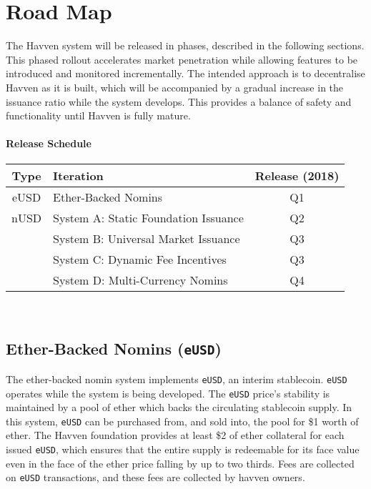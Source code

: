 \section{Road Map}

The Havven system will be released in phases, described in the following
sections. This phased rollout accelerates market penetration while
allowing features to be introduced and monitored incrementally. The intended approach  
is to decentralise Havven as it is built, which will be accompanied by a gradual
increase in the issuance ratio while the system develops.
This provides a balance of safety and functionality until Havven is fully
mature.

\paragraph{Release Schedule}
\renewcommand{\arraystretch}{1.5}
\setlength{\tabcolsep}{13pt}
\begin{centering}
    \begin{tabular}{|c|l|c|}
        \hline
        \textbf{Type} & \textbf{Iteration} & \textbf{Release (2018)} \\
        \hline
        \hline
        eUSD & Ether-Backed Nomins & Q1 \\
        \hline
        \hline
        nUSD & System A: Static Foundation Issuance & Q2 \\ \cline{2-3}
        & System B: Universal Market Issuance & Q3 \\ \cline{2-3}
        & System C: Dynamic Fee Incentives & Q3 \\ \cline{2-3}
        & System D: Multi-Currency Nomins& Q4 \\
        \hline
    \end{tabular} \\
\end{centering}
\vspace{0.5cm}

\subsection{Ether-Backed Nomins (\texttt{eUSD})}

\noindent The ether-backed nomin system implements \texttt{eUSD}, an interim stablecoin.
\texttt{eUSD} operates while the system is being developed.
The \texttt{eUSD} price's stability is maintained by a pool of ether which
backs the circulating stablecoin supply. In this system, \texttt{eUSD} can be
purchased from, and sold into, the pool for \$1 worth of ether.
The Havven foundation provides at least \$2 of ether collateral for each
issued \texttt{eUSD}, which ensures that the entire supply is redeemable for its
face value even in the face of the ether price falling by up to two thirds.
Fees are collected on \texttt{eUSD} transactions, and these fees are collected
by havven owners. \\

